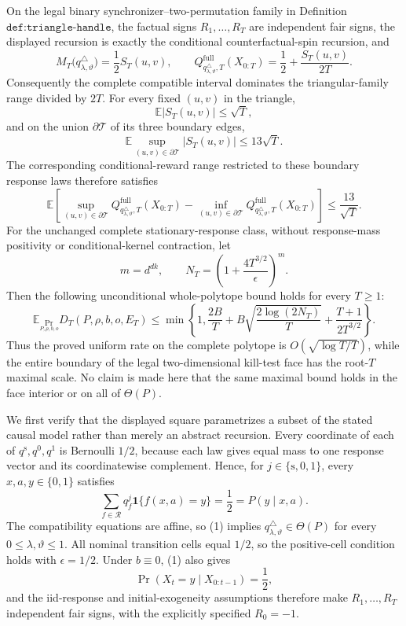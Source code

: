 On the legal binary synchronizer--two-permutation family in Definition \(\texttt{def:triangle-handle}\), the factual signs \(R_1,\ldots,R_T\) are independent fair signs, the displayed recursion is exactly the conditional counterfactual-spin recursion, and
\[
 M_T\bigl(q^{\triangle}_{\lambda,\vartheta}\bigr)
 =\frac12 S_T(u,v),\qquad
 Q^{\mathrm{full}}_{q^{\triangle}_{\lambda,\vartheta},T}(X_{0:T})
 =\frac12+\frac{S_T(u,v)}{2T}.
\]
Consequently the complete compatible interval dominates the triangular-family range divided by \(2T\).  For every fixed \((u,v)\) in the triangle,
\[
 \mathbb E|S_T(u,v)|\leq\sqrt T,
\]
and on the union \(\partial\mathcal T\) of its three boundary edges,
\[
 \mathbb E\sup_{(u,v)\in\partial\mathcal T}|S_T(u,v)|\leq13\sqrt T.
\]
The corresponding conditional-reward range restricted to these boundary response laws therefore satisfies
\[
 \mathbb E\left[
 \sup_{(u,v)\in\partial\mathcal T}Q^{\mathrm{full}}_{q^{\triangle}_{\lambda,\vartheta},T}(X_{0:T})
 -\inf_{(u,v)\in\partial\mathcal T}Q^{\mathrm{full}}_{q^{\triangle}_{\lambda,\vartheta},T}(X_{0:T})
 \right]\leq\frac{13}{\sqrt T}.
\]
For the unchanged complete stationary-response class, without response-mass positivity or conditional-kernel contraction, let
\[
 m=d^{dk},\qquad
 N_T=\left(1+\frac{4T^{3/2}}{\epsilon}\right)^m.
\]
Then the following unconditional whole-polytope bound holds for every \(T\geq1\):
\[
 \mathbb E_{\Pr_{P,\rho,b,o}}D_T(P,\rho,b,o,E_T)
 \leq
 \min\left\{1,\frac{2B}{T}
 +B\sqrt{\frac{2\log(2N_T)}{T}}
 +\frac{T+1}{2T^{3/2}}\right\}.
\]
Thus the proved uniform rate on the complete polytope is \(O(\sqrt{\log T/T})\), while the entire boundary of the legal two-dimensional kill-test face has the root-\(T\) maximal scale.  No claim is made here that the same maximal bound holds in the face interior or on all of \(\Theta(P)\).

We first verify that the displayed square parametrizes a subset of the stated causal model rather than merely an abstract recursion.  Every coordinate of each of \(q^{\mathrm s},q^0,q^1\) is Bernoulli \(1/2\), because each law gives equal mass to one response vector and its coordinatewise complement.  Hence, for \(j\in\{\mathrm s,0,1\}\), every \(x,a,y\in\{0,1\}\) satisfies
\[
 \sum_{f\in\mathcal R}q^j_f\mathbf 1\{f(x,a)=y\}=\frac12=P(y\mid x,a).
 \tag{1}
\]
The compatibility equations are affine, so (1) implies
\(q^{\triangle}_{\lambda,\vartheta}\in\Theta(P)\) for every \(0\leq\lambda,\vartheta\leq1\).  All nominal transition cells equal \(1/2\), so the positive-cell condition holds with \(\epsilon=1/2\).  Under \(b\equiv0\), (1) also gives
\[
 \Pr(X_t=y\mid X_{0:t-1})=\frac12,
\]
and the iid-response and initial-exogeneity assumptions therefore make \(R_1,\ldots,R_T\) independent fair signs, with the explicitly specified \(R_0=-1\).

